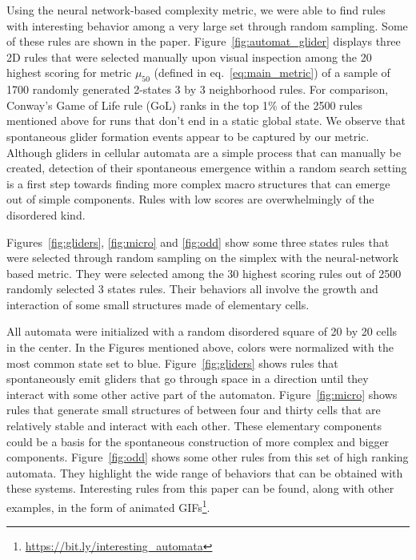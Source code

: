 Using the neural network-based complexity metric, we were able to find rules
with interesting behavior among a very large set through random sampling. Some
of these rules are shown in the paper. Figure~\ref{fig:automat_glider} displays
three 2D rules that were selected manually upon visual inspection among the 20
highest scoring for metric $\mu_{50}$ (defined in eq.~\eqref{eq:main_metric}) of
a sample of 1700 randomly generated 2-states 3 by 3 neighborhood rules. For
comparison, Conway's Game of Life rule (GoL) ranks in the top 1\% of the 2500
rules mentioned above for runs that don't end in a static global state. We
observe that spontaneous glider formation events appear to be captured by our
metric. Although gliders in cellular automata are a simple process that can
manually be created, detection of their spontaneous emergence within a random
search setting is a first step towards finding more complex macro structures
that can emerge out of simple components. Rules with low scores are
overwhelmingly of the disordered kind.

Figures~\ref{fig:gliders}, \ref{fig:micro} and \ref{fig:odd} show some three
states rules that were selected through random sampling on the simplex with the
neural-network based metric. They were selected among the 30 highest scoring
rules out of 2500 randomly selected 3 states rules. Their behaviors all involve
the growth and interaction of some small structures made of elementary cells.

All automata were initialized with a random disordered square of 20 by 20 cells
in the center. In the Figures mentioned above, colors were normalized with the
most common state set to blue. Figure~\ref{fig:gliders} shows rules that
spontaneously emit gliders that go through space in a direction until they
interact with some other active part of the automaton. Figure~\ref{fig:micro}
shows rules that generate small structures of between four and thirty cells that
are relatively stable and interact with each other. These elementary components
could be a basis for the spontaneous construction of more complex and bigger
components. Figure~\ref{fig:odd} shows some other rules from this set of high
ranking automata. They highlight the wide range of behaviors that can be
obtained with these systems. Interesting rules from this paper can be found,
along with other examples, in the form of animated
GIFs\footnote{\url{https://bit.ly/interesting_automata}}.


